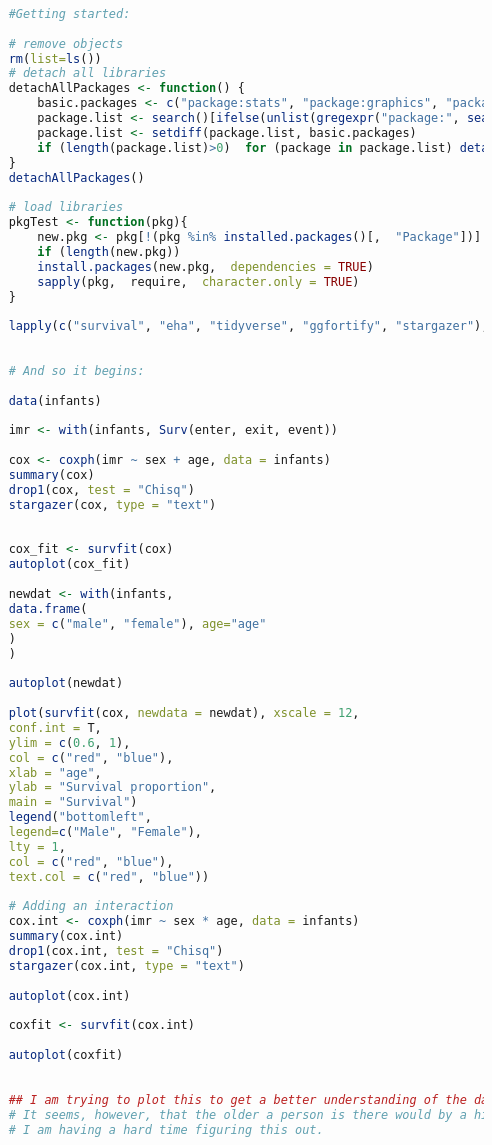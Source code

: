\documentclass[12pt,letterpaper]{article}
\begin{document}
\begin{lstlisting}[language=R]
	
	#Getting started:
	
	# remove objects
	rm(list=ls())
	# detach all libraries
	detachAllPackages <- function() {
		basic.packages <- c("package:stats", "package:graphics", "package:grDevices", "package:utils", "package:datasets", "package:methods", "package:base")
		package.list <- search()[ifelse(unlist(gregexpr("package:", search()))==1, TRUE, FALSE)]
		package.list <- setdiff(package.list, basic.packages)
		if (length(package.list)>0)  for (package in package.list) detach(package,  character.only=TRUE)
	}
	detachAllPackages()
	
	# load libraries
	pkgTest <- function(pkg){
		new.pkg <- pkg[!(pkg %in% installed.packages()[,  "Package"])]
		if (length(new.pkg)) 
		install.packages(new.pkg,  dependencies = TRUE)
		sapply(pkg,  require,  character.only = TRUE)
	}
	
	lapply(c("survival", "eha", "tidyverse", "ggfortify", "stargazer"),  pkgTest)
	
	
	# And so it begins:
	
	data(infants)
	
	imr <- with(infants, Surv(enter, exit, event))
	
	cox <- coxph(imr ~ sex + age, data = infants)
	summary(cox)
	drop1(cox, test = "Chisq")
	stargazer(cox, type = "text")
	
	
	cox_fit <- survfit(cox)
	autoplot(cox_fit)
	
	newdat <- with(infants, 
	data.frame(
	sex = c("male", "female"), age="age"
	)
	)
	
	autoplot(newdat)
	
	plot(survfit(cox, newdata = newdat), xscale = 12,
	conf.int = T,
	ylim = c(0.6, 1),
	col = c("red", "blue"),
	xlab = "age",
	ylab = "Survival proportion",
	main = "Survival")
	legend("bottomleft",
	legend=c("Male", "Female"),
	lty = 1, 
	col = c("red", "blue"),
	text.col = c("red", "blue"))
	
	# Adding an interaction
	cox.int <- coxph(imr ~ sex * age, data = infants)
	summary(cox.int)
	drop1(cox.int, test = "Chisq")
	stargazer(cox.int, type = "text")
	
	autoplot(cox.int)
	
	coxfit <- survfit(cox.int)
	
	autoplot(coxfit)
	
	
	## I am trying to plot this to get a better understanding of the data, but I am having no luck. 
	# It seems, however, that the older a person is there would by a higher rate of death. But, again,
	# I am having a hard time figuring this out.

\end{lstlisting}
\end{document}
